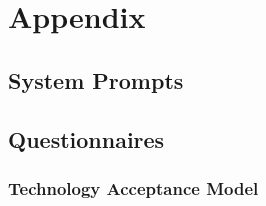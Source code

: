 \section*{Appendix}


\subsection*{System Prompts}



\clearpage



\newpage
\subsection*{Questionnaires}

\subsubsection*{Technology Acceptance Model}

